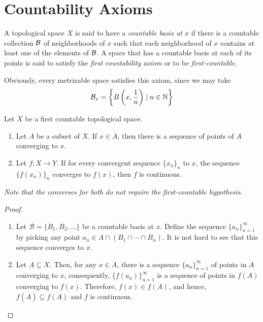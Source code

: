 \section{Countability Axioms}

\begin{definition}
    A topological space $X$ is said to have a \textit{countable basis at $x$} if there is a countable collection $\mathcal{B}$ of neighborhoods of $x$ such that each neighborhood of $x$ contains at least one of the elements of $\mathcal{B}$. A space that has a countable basis at each of its points is said to satisfy the \textit{first countability axiom} or to be \textit{first-countable}.
\end{definition}

Obviously, every metrizable space satisfies this axiom, since we may take 
\begin{equation*}
    \mathcal{B}_x = \left\{B\left(x, \frac{1}{n}\right)\mid n\in\mathbb{N}\right\}
\end{equation*}

\begin{theorem}
    Let $X$ be a first countable topological space. 
    \begin{enumerate}
        \item Let $A$ be a subset of $X$. If $x\in\overline{A}$, then there is a sequence of points of $A$ converging to $x$.

        \item Let $f:X\to Y$. If for every convergent sequence $\{x_n\}_n$ to $x$, the sequence $\{f(x_n)\}_n$ converges to $f(x)$, then $f$ is continuous.
    \end{enumerate}
    \textit{Note that the converses for both do not require the first-countable hypothesis}.
\end{theorem}
\begin{proof}
    \hfill 
    \begin{enumerate}
    \item Let $\mathcal B = \{B_1,B_2,\ldots\}$ be a countable basis at $x$. Define the sequence $\{a_n\}_{n = 1}^\infty$ by picking any point $a_n\in A\cap(B_1\cap\cdots\cap B_n)$. It is not hard to see that this sequence converges to $x$.

    \item Let $A\subseteq X$. Then, for any $x\in\overline A$, there is a sequence $\{a_n\}_{n = 1}^\infty$ of points in $A$ converging to $x$, consequently, $\{f(a_n)\}_{n = 1}^\infty$ is a sequence of points in $f(A)$ converging to $f(x)$. Therefore, $f(x)\in\overline{f(A)}$, and hence, $f(\overline A)\subseteq\overline{f(A)}$ and $f$ is continuous.
    \end{enumerate}
\end{proof}

